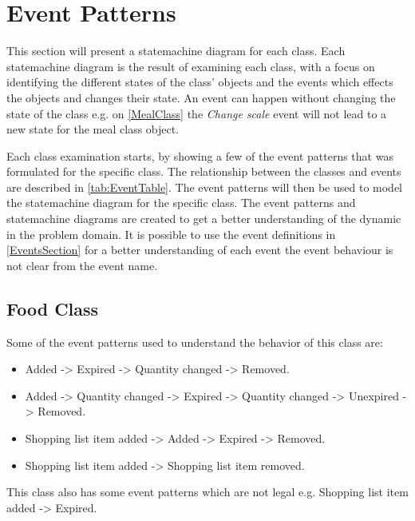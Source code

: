 \section{Event Patterns} \label{EventPatters}
This section will present a statemachine diagram for each class. Each statemachine diagram is the result of examining each class, with a focus on identifying the different states of the class' objects and the events which effects the objects and changes their state. An event can happen without changing the state of the class e.g. on \cref{MealClass} the \textit{Change scale} event will not lead to a new state for the meal class object.  

Each class examination starts, by showing a few of the event patterns that was formulated for the specific class. The relationship between the classes and events are described in \cref{tab:EventTable}. The event patterns will then be used to model the statemachine diagram for the specific class. The event patterns and statemachine diagrams are created to get a better understanding of the dynamic in the problem domain. It is possible to use the event definitions in \cref{EventsSection} for a better understanding of each event the event behaviour is not clear from the event name.   

\subsection{Food Class}
Some of the event patterns used to understand the behavior of this class are:
\begin{itemize}
	\item Added -> Expired -> Quantity changed -> Removed.
	\item Added -> Quantity changed -> Expired -> Quantity changed -> Unexpired -> Removed.
	\item Shopping list item added -> Added -> Expired -> Removed.
	\item Shopping list item added -> Shopping list item removed.
\end{itemize}

This class also has some event patterns which are not legal e.g. 
Shopping list item added -> Expired.

